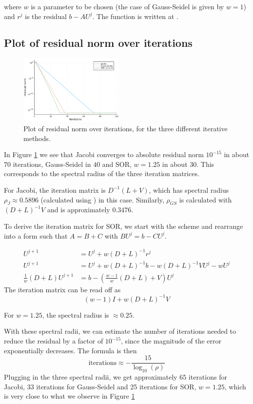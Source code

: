 \documentclass{article}
\numberwithin{equation}{section}
\theoremstyle{definition}
\begin{document}
where $w$ is a parameter to be chosen (the case of Gauss-Seidel is given by $w=1$) and $r^j$ is the residual $b - AU^j$.
The function is written at .

\subsection{Plot of residual norm over iterations}
\begin{figure}[H]
    \centering
    \includegraphics[width=0.46\textwidth]{fig1.png}
    \caption{Plot of residual norm over iterations, for the three different iterative methods.}
    \label{fig:afig_1}
\end{figure}
In Figure \ref{fig:afig_1} we see that Jacobi converges to absolute residual norm $10^{-15}$ in about $70$ iterations, Gauss-Seidel in $40$ and SOR, $w=1.25$ in about $30$. This corresponds to the spectral radius of the three iteration matrices.

For Jacobi, the iteration matrix is $D^{-1}(L+V)$, which has spectral radius $\rho_J \approx 0.5896$ (calculated using ) in this case. Similarly, $\rho_{GS}$ is calculated with $(D+L)^{-1}V$ and is approximately $0.3476$.

To derive the iteration matrix for SOR, we start with the scheme and rearrange into a form such that $A = B+C$ with $BU^j = b - CU^j$.

\begin{align}
    U^{j+1} &= U^j + w(D+L)^{-1}r^j \\
    U^{j+1} &= U^j + w(D+L)^{-1}b - w(D+L)^{-1}VU^j-w U^j\\
    \frac 1w (D+L)U^{j+1} &= b - \left(\frac{w-1}{w}(D+L) + V\right)U^j
\end{align}
The iteration matrix can be read off as
\begin{equation}
    \label{eq:sor_it_mat}
    (w-1)I + w(D+L)^{-1}V
\end{equation}

For $w=1.25$, the spectral radius is $\approx 0.25$.


With these spectral radii, we can estimate the number of iterations needed to reduce the residual by a factor of $10^{-15}$, since the magnitude of the error exponentially decreases. The formula is then
\begin{equation}
    \text{iterations} \approx -\frac{15}{\log_{10}(\rho)}
\end{equation}
Plugging in the three spectral radii, we get approximately 65 iterations for Jacobi, 33 iterations for Gauss-Seidel and 25 iterations for SOR, $w=1.25$, which is very close to what we observe in Figure \ref{fig:afig_1}
\end{document}
